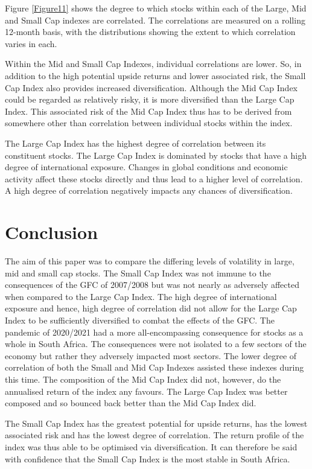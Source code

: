 \documentclass[11pt,preprint, authoryear]{elsarticle}
\numberwithin{equation}{section}
\numberwithin{figure}{section}
\numberwithin{table}{section}
\begin{document}
Figure \ref{Figure11} shows the degree to which stocks within each of
the Large, Mid and Small Cap indexes are correlated. The correlations
are measured on a rolling 12-month basis, with the distributions showing
the extent to which correlation varies in each.

Within the Mid and Small Cap Indexes, individual correlations are lower.
So, in addition to the high potential upside returns and lower
associated risk, the Small Cap Index also provides increased
diversification. Although the Mid Cap Index could be regarded as
relatively risky, it is more diversified than the Large Cap Index. This
associated risk of the Mid Cap Index thus has to be derived from
somewhere other than correlation between individual stocks within the
index.

The Large Cap Index has the highest degree of correlation between its
constituent stocks. The Large Cap Index is dominated by stocks that have
a high degree of international exposure. Changes in global conditions
and economic activity affect these stocks directly and thus lead to a
higher level of correlation. A high degree of correlation negatively
impacts any chances of diversification.

\hypertarget{conclusion}{%
\section{\texorpdfstring{Conclusion
\label{Conclusion}}{Conclusion }}\label{conclusion}}

The aim of this paper was to compare the differing levels of volatility
in large, mid and small cap stocks. The Small Cap Index was not immune
to the consequences of the GFC of 2007/2008 but was not nearly as
adversely affected when compared to the Large Cap Index. The high degree
of international exposure and hence, high degree of correlation did not
allow for the Large Cap Index to be sufficiently diversified to combat
the effects of the GFC. The pandemic of 2020/2021 had a more
all-encompassing consequence for stocks as a whole in South Africa. The
consequences were not isolated to a few sectors of the economy but
rather they adversely impacted most sectors. The lower degree of
correlation of both the Small and Mid Cap Indexes assisted these indexes
during this time. The composition of the Mid Cap Index did not, however,
do the annualised return of the index any favours. The Large Cap Index
was better composed and so bounced back better than the Mid Cap Index
did.

The Small Cap Index has the greatest potential for upside returns, has
the lowest associated risk and has the lowest degree of correlation. The
return profile of the index was thus able to be optimised via
diversification. It can therefore be said with confidence that the Small
Cap Index is the most stable in South Africa.
\end{document}
